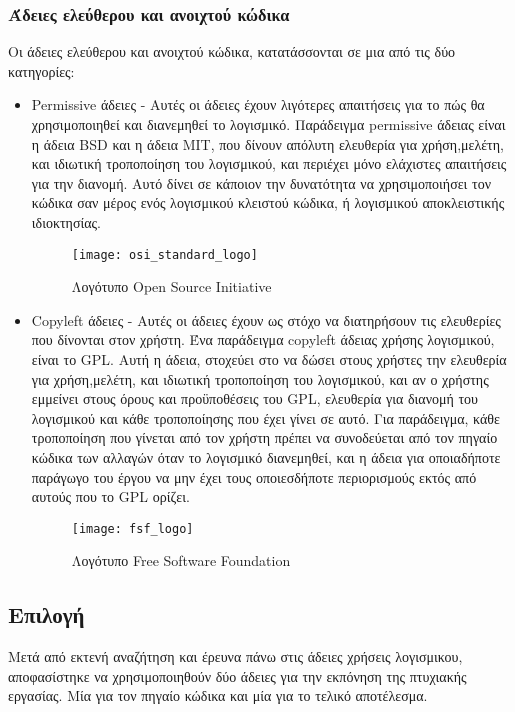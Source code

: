 \subsubsection{Άδειες ελεύθερου και ανοιχτού κώδικα}
Οι άδειες ελεύθερου και ανοιχτού κώδικα, κατατάσσονται σε μια από τις δύο κατηγορίες: 
\begin{itemize}
\item Permissive άδειες - Αυτές οι άδειες έχουν λιγότερες απαιτήσεις για το πώς θα χρησιμοποιηθεί και διανεμηθεί το λογισμικό. Παράδειγμα permissive άδειας είναι η άδεια BSD και η άδεια MIT, που δίνουν απόλυτη ελευθερία για χρήση,μελέτη, και ιδιωτική τροποποίηση του λογισμικού, και περιέχει μόνο ελάχιστες απαιτήσεις για την διανομή. Αυτό δίνει σε κάποιον την δυνατότητα να χρησιμοποιήσει τον κώδικα σαν μέρος ενός λογισμικού κλειστού κώδικα, ή λογισμικού αποκλειστικής ιδιοκτησίας.
\begin{figure}[h]
	\centering
	\texttt{[image: osi\_standard\_logo]}
	\caption{Λογότυπο Open Source Initiative\cite{figure-26}}
\end{figure}
\item Copyleft άδειες - Αυτές οι άδειες έχουν ως στόχο να διατηρήσουν τις ελευθερίες που δίνονται στον χρήστη. Ένα παράδειγμα copyleft άδειας χρήσης λογισμικού, είναι το GPL. Αυτή η άδεια, στοχεύει στο να δώσει στους χρήστες την ελευθερία για χρήση,μελέτη, και ιδιωτική τροποποίηση του λογισμικού, και αν ο χρήστης εμμείνει στους όρους και προϋποθέσεις του GPL, ελευθερία για διανομή του λογισμικού και κάθε τροποποίησης που έχει γίνει σε αυτό. Για παράδειγμα, κάθε τροποποίηση που γίνεται από τον χρήστη πρέπει να συνοδεύεται από τον πηγαίο κώδικα των αλλαγών όταν το λογισμικό διανεμηθεί, και η άδεια για οποιαδήποτε παράγωγο του έργου να μην έχει τους οποιεσδήποτε περιορισμούς εκτός από αυτούς που το GPL ορίζει.
\begin{figure}[h]
	\centering
	\texttt{[image: fsf\_logo]}
	\caption{Λογότυπο Free Software Foundation\cite{figure-27}}
\end{figure}
\end{itemize}

\subsection{Επιλογή}
Μετά από εκτενή αναζήτηση και έρευνα πάνω στις άδειες χρήσεις λογισμικου, αποφασίστηκε να χρησιμοποιηθούν δύο άδειες για την εκπόνηση της πτυχιακής εργασίας. Μία για τον πηγαίο κώδικα και μία για το τελικό αποτέλεσμα. 
